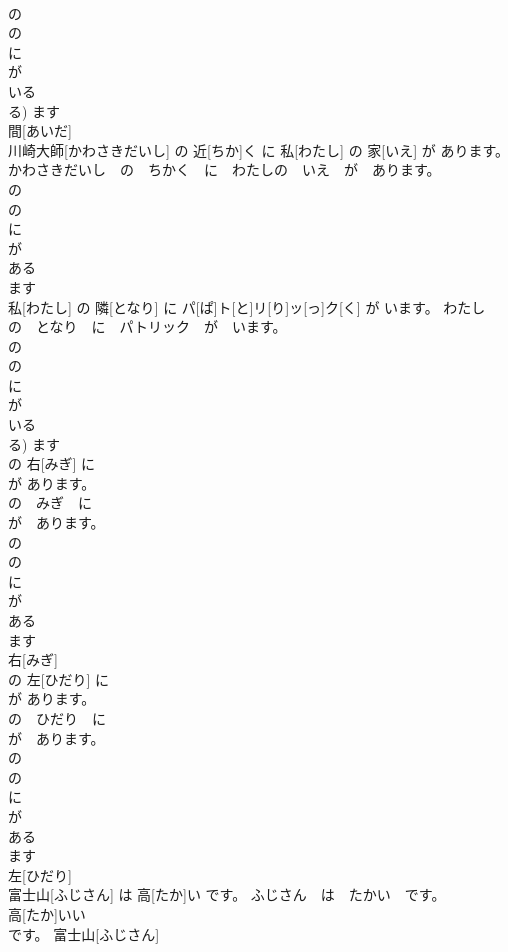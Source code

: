 \documentclass[8pt]{extreport}
\begin{document}
\begin{CJK}{UTF8}{min}
\\	の 
\\	の 
\\	に 
\\	が 
\\	いる 
\\	る)	ます 
\\	間[あいだ] 
\\	川崎大師[かわさきだいし] の 近[ちか]く に 私[わたし] の 家[いえ] が あります。	かわさきだいし　の　ちかく　に　わたしの　いえ　が　あります。	
\\	の 
\\	の 
\\	に 
\\	が 
\\	ある 
\\	ます 
\\	私[わたし] の 隣[となり] に パ[ぱ]ト[と]リ[り]ッ[っ]ク[く] が います。	わたし　の　となり　に　パトリック　が　います。	
\\	の 
\\	の 
\\	に 
\\	が 
\\	いる 
\\	る)	ます 
\\	の 右[みぎ] に 
\\	が あります。	
\\	の　みぎ　に　
\\	が　あります。	
\\	の 
\\	の 
\\	に 
\\	が 
\\	ある 
\\	ます 
\\	右[みぎ] 
\\	の 左[ひだり] に 
\\	が あります。	
\\	の　ひだり　に　
\\	が　あります。	
\\	の 
\\	の 
\\	に 
\\	が 
\\	ある 
\\	ます 
\\	左[ひだり] 
\\	富士山[ふじさん] は 高[たか]い です。	ふじさん　は　たかい　です。	
\\	高[たか]いい 
\\	です。	富士山[ふじさん] 

\end{CJK}
\end{document}
